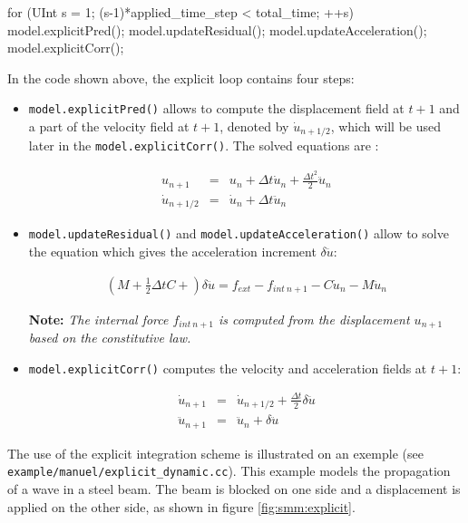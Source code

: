\documentclass[a4paper,11pt]{book}
\newcommand{\code}[1]{\texttt{#1}}
\newcommand{\note}[1]{\textbf{Note: }\textit{#1}}
\begin{document}
\begin{cpp}
  for (UInt s = 1; (s-1)*applied_time_step < total_time; ++s) {
    model.explicitPred();
    model.updateResidual();
    model.updateAcceleration();
    model.explicitCorr();
  }
\end{cpp}

In the code shown above, the explicit loop contains four steps:
\begin{itemize}
\item \code{model.explicitPred()} allows to compute the displacement field at $t+1$ and a 
part of the velocity field at $t+1$, denoted by $\dot{u}_{n+1/2}$, which will be used later in 
the \code{model.explicitCorr()}. The solved equations are :

\begin{eqnarray}
  u_{n+1}        &=& u_{n} +  \Delta t \dot{u}_{n} + \frac{\Delta t^2}{2} \ddot{u}_{n} \\
  \dot{u}_{n+1/2}  &=& \dot{u}_{n} +  \Delta t  \ddot{u}_{n}
  \label{eqn:smm:explicit:onehalfvelocity}
\end{eqnarray}

\item \code{model.updateResidual()} and \code{model.updateAcceleration()} allow to 
solve the equation which gives the acceleration increment $\delta \ddot{u}$:

\begin{eqnarray}
 (M + \frac{1}{2} \Delta t C + ) \delta \ddot{u} = f_{ext} - f_{int~n+1} - C \dot{u}_{n} - M \ddot{u}_{n}
\end{eqnarray}

\note{The internal force $f_{int~n+1}$ is computed from the displacement $u_{n+1}$ based on the constitutive law.} 

\item \code{model.explicitCorr()} computes the velocity and acceleration fields at $t+1$:

\begin{eqnarray}
\dot{u}_{n+1}  &=& \dot{u}_{n+1/2} + \frac{\Delta t}{2} \delta \ddot{u} \\
\ddot{u}_{n+1}  &=& \ddot{u}_{n} +  \delta \ddot{u}
\end{eqnarray}

\end{itemize}
The use of the explicit integration scheme is illustrated on an exemple
(see \code{example/manuel/explicit\_dynamic.cc}).
This example models the propagation of a wave in a steel beam. The beam 
is blocked on one side and a displacement is applied on the other side, as shown in figure \ref{fig:smm:explicit}. 
\end{document}
